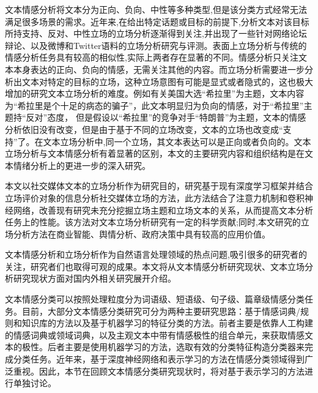 文本情感分析将文本分为正向、负向、中性等多种类型,但是该分类方式经常无法满足很多场景的需求。近年来,在给出特定话题或目标的前提下,分析文本对该目标所持支持、反对、中性立场的立场分析逐渐得到关注,并出现了一些针对网络论坛辩论、以及微博和Twitter语料的立场分析研究与评测。表面上立场分析与传统的情感分析任务具有较高的相似性,实际上两者存在显著的不同。情感分析只关注文本本身表达的正向、负向的情感，无需关注其他的内容。而立场分析需要进一步分析出文本对特定的目标的立场，这种立场意图有可能是显式或者隐式的，这也极大增加的研究文本立场分析的难度。例如有关美国大选“希拉里”为主题，文本内容为“希拉里是个十足的病态的骗子”，此文本明显归为负向的情感，对于“希拉里”主题持“反对”态度， 但是假设以“希拉里”的竞争对手“特朗普”为主题，文本的情感分析依旧没有改变，但是由于基于不同的立场改变，文本的立场也改变成“支持”了。在文本立场分析中,同一个立场，其文本表达可以是正向或者负向的。文本立场分析与文本情感分析有着显著的区别，本文的主要研究内容和组织结构是在文本情绪分析上的更进一步的深入研究。

本文以社交媒体文本的立场分析作为研究目的，研究基于现有深度学习框架并结合立场评价对象的信息分析社交媒体立场的方法，此方法结合了注意力机制和卷积神经网络，改善现有研究未充分挖掘立场主题和立场文本的关系，从而提高文本分析任务上的性能。该方法对文本立场分析研究有一定的科学贡献;同时,本文研究的立场分析方法在商业智能、舆情分析、政府决策中具有较高的应用价值。



文本情感分析和立场分析作为自然语言处理领域的热点问题,吸引很多的研究者的关注，研究者们也取得可观的成果。本文将从文本情感分析研究现状、文本立场分析研究现状方面对国内外相关研究展开介绍。



文本情感分类可以按照处理粒度分为词语级、短语级、句子级、篇章级情感分类任务。目前，大部分文本情感分类研究可分为两种主要研究思路：基于情感词典/规则和知识库的方法以及基于机器学习的特征分类的方法。前者主要是依靠人工构建的情感词典或领域词典，以及主观文本中带有情感极性的组合单元，来获取情感文本的极性。后者主要是使用机器学习的方法，选取有效的分类特征构造分类器来完成分类任务。近年来，基于深度神经网络和表示学习的方法在情感分类领域得到广泛重视。因此，本节在回顾文本情感分类研究现状时，将对基于表示学习的方法进行单独讨论。

